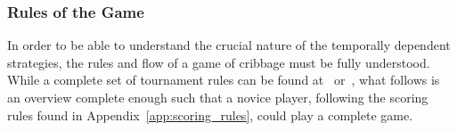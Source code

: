 
\subsubsection*{Rules of the Game}

In order to be able to understand the crucial nature of the temporally dependent
strategies, the rules and flow of a game of cribbage must be fully understood.
%
While a complete set of tournament rules can be found at~\cite{ACC_rules}
or~\cite{ACC_rulebook},
what follows is an overview complete enough such that a novice player,
following the scoring rules found in Appendix~\ref{app:scoring_rules},
could play a complete game.

